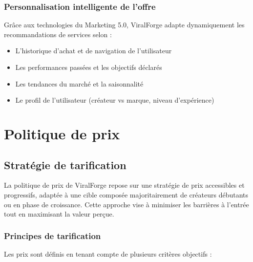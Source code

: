 \subsubsection{Personnalisation intelligente de l'offre}

Grâce aux technologies du Marketing 5.0, ViralForge adapte dynamiquement les recommandations de services selon :
\begin{itemize}
    \item L'historique d'achat et de navigation de l'utilisateur
    \item Les performances passées et les objectifs déclarés
    \item Les tendances du marché et la saisonnalité
    \item Le profil de l'utilisateur (créateur vs marque, niveau d'expérience)
\end{itemize}

\newpage

\section{Politique de prix}

\subsection{Stratégie de tarification}

La politique de prix de ViralForge repose sur une stratégie de prix accessibles et progressifs, adaptée à une cible composée majoritairement de créateurs débutants ou en phase de croissance. Cette approche vise à minimiser les barrières à l'entrée tout en maximisant la valeur perçue.

\subsubsection{Principes de tarification}

Les prix sont définis en tenant compte de plusieurs critères objectifs :

